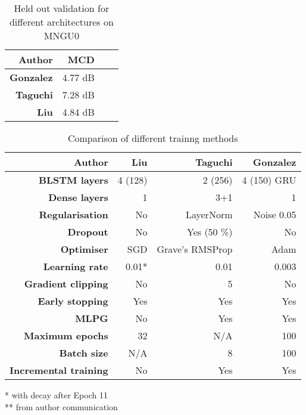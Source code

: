\documentclass[a4paper]{article}
\begin{document}
%

\begin{table}[th]
  \caption{Held out validation for different architectures on MNGU0}
  \label{tab:pilot}
  \centering
  \footnotesize

  \begin{tabular}{ r r r r }
    \toprule
    \textbf{Author} & \textbf{MCD} \\
    \midrule
    \textbf{Gonzalez} & 4.77 dB \\
    \textbf{Taguchi} & 7.28 dB \\
    \textbf{Liu} & 4.84 dB \\
    \bottomrule
  \end{tabular}
\end{table}

\begin{table}[th]
  \caption{Comparison of different trainng methods}
  \label{tab:architectures}
  \centering
  \footnotesize

  \begin{tabular}{ r r r r }
    \toprule
    \textbf{Author} & \textbf{Liu} & \textbf{Taguchi} & \textbf{Gonzalez} \\
    \midrule
    \textbf{BLSTM layers} & 4 (128) & 2 (256) & 4 (150) GRU \\
    \textbf{Dense layers} & 1 & 3+1 & 1 \\
    \textbf{Regularisation} & No & LayerNorm & Noise 0.05 \\
    \textbf{Dropout} & No & Yes (50 \%) & No \\
    \textbf{Optimiser} & SGD & Grave's RMSProp & Adam \\
    \textbf{Learning rate} & 0.01* & 0.01 & 0.003 \\
    \textbf{Gradient clipping} & No & 5 & No \\
    \textbf{Early stopping} & Yes & Yes & Yes \\
    \textbf{MLPG} \cite{Wu2016} & No & Yes & Yes \\ 
    \textbf{Maximum epochs} & 32 & N/A & 100 \\
    \textbf{Batch size} & N/A & 8 & 100 \\
    \textbf{Incremental training} & No & Yes & Yes \\
    \bottomrule
  \end{tabular}
  * with decay after Epoch 11 \\
  ** from author communication
\end{table}
\end{document}
